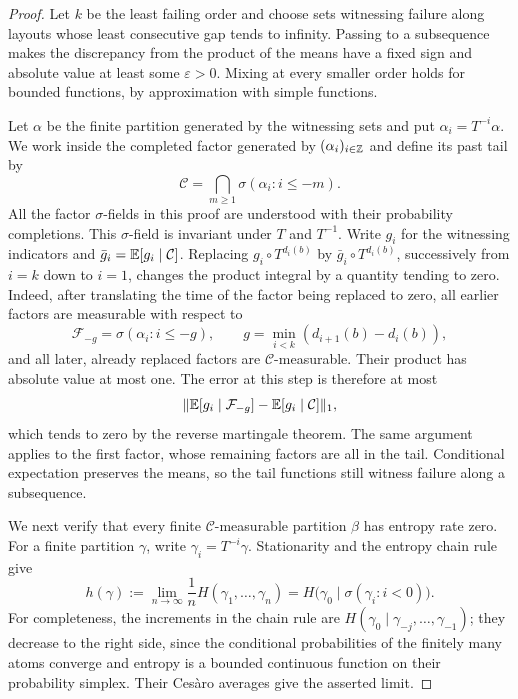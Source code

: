 \begin{proof}
Let $k$ be the least failing order and choose sets witnessing failure along
layouts whose least consecutive gap tends to infinity.  Passing to a
subsequence makes the discrepancy from the product of the means have a
fixed sign and absolute value at least some $\varepsilon>0$.  Mixing at
every smaller order holds for bounded functions, by approximation with
simple functions.

Let $\alpha$ be the finite partition generated by the witnessing sets and
put $\alpha_i=T^{-i}\alpha$.  We work inside the completed factor generated
by $(\alpha_i)_{i\in\mathbb Z}$ and define its past tail by
\[
\mathcal C=\bigcap_{m\geq1}\sigma(\alpha_i:i\leq-m).
\]
All the factor $\sigma$-fields in this proof are understood with their
probability completions.
This $\sigma$-field is invariant under $T$ and $T^{-1}$.  Write $g_i$ for
the witnessing indicators and $\bar g_i=\mathbb E[g_i\mid\mathcal C]$.  Replacing
$g_i\circ T^{d_i(b)}$ by $\bar g_i\circ T^{d_i(b)}$, successively from
$i=k$ down to $i=1$, changes the product integral by a quantity tending to
zero.  Indeed, after translating the time of the factor being replaced to
zero, all earlier factors are measurable with respect to
\[
 \mathcal F_{-g}=\sigma(\alpha_i:i\leq-g),
 \qquad g=\min_{i<k}(d_{i+1}(b)-d_i(b)),
\]
and all later, already replaced factors are $\mathcal C$-measurable.
Their product has absolute value at most one.  The error at this step is
therefore at most
\[
 \lVert \mathbb E[g_i\mid\mathcal F_{-g}]-\mathbb E[g_i\mid\mathcal C]\rVert_1,
\]
which tends to zero by the reverse martingale theorem.  The same argument
applies to the first factor, whose remaining factors are all in the tail.
Conditional expectation preserves the means, so the tail functions still
witness failure along a subsequence.

We next verify that every finite $\mathcal C$-measurable partition $\beta$
has entropy rate zero.  For a finite partition $\gamma$, write
$\gamma_i=T^{-i}\gamma$. Stationarity and
the entropy chain rule give
\begin{equation}\label{eq:entropy-past-formula}
 h(\gamma):=\lim_{n\to\infty}\frac1nH(\gamma_1,\ldots,\gamma_n)
 =H\bigl(\gamma_0\mid\sigma(\gamma_i:i<0)\bigr).
\end{equation}
For completeness, the increments in the chain rule are
$H(\gamma_0\mid\gamma_{-j},\ldots,\gamma_{-1})$; they decrease to the
right side, since the conditional probabilities of the finitely many
atoms converge and entropy is a bounded continuous function on their
probability simplex.  Their Ces\`aro averages give the asserted limit.


\end{proof}
